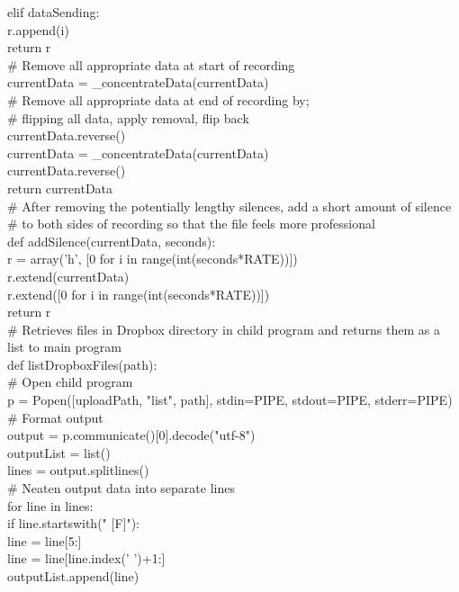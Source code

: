 \documentclass[a4paper,11pt]{report}
\begin{document}
            elif dataSending:\\
                r.append(i)\\
                
        return r    \\

    \# Remove all appropriate data at start of recording\\
    currentData = \_concentrateData(currentData)    \\

    \# Remove all appropriate data at end of recording by;\\
    \# flipping all data, apply removal, flip back \\
    currentData.reverse()\\
    currentData = \_concentrateData(currentData)\\
    currentData.reverse()\\
    return currentData\\

\# After removing the potentially lengthy silences, add a short amount of silence \\
\# to both sides of recording so that the file feels more professional\\
def addSilence(currentData, seconds):\\
    r = array('h', [0 for i in range(int(seconds*RATE))])\\
    r.extend(currentData)\\
    r.extend([0 for i in range(int(seconds*RATE))])\\
    return r\\

\# Retrieves files in Dropbox directory in child program and returns them as a list to main program\\
def listDropboxFiles(path):\\
    \# Open child program\\
    p = Popen([uploadPath, "list", path], stdin=PIPE, stdout=PIPE, stderr=PIPE)\\
    \# Format output\\
    output = p.communicate()[0].decode("utf-8")\\

    outputList = list()\\
    lines = output.splitlines()\\

    \# Neaten output data into separate lines\\
    for line in lines:\\
        if line.startswith(" [F]"):\\
            line = line[5:]\\
            line = line[line.index(' ')+1:]\\
            outputList.append(line)\\
                   
\end{document}
